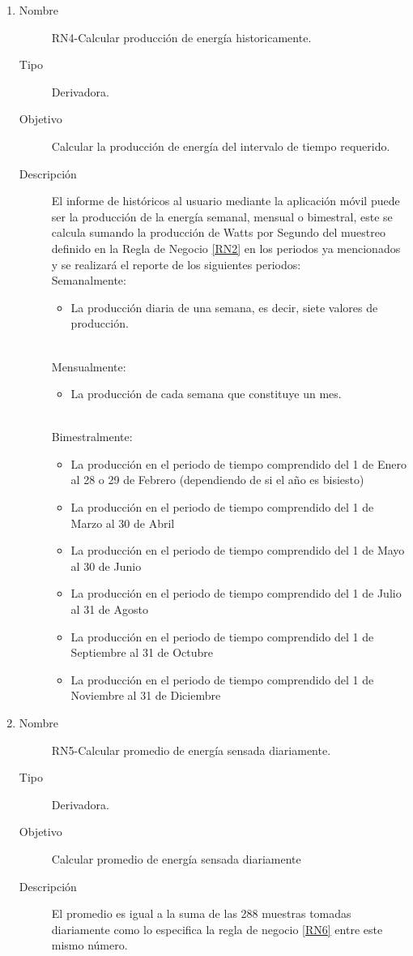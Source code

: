 \begin{enumerate}[label=RN\arabic*.]
\item \label{RN4}
		\begin{description}
			\item[Nombre] RN4-Calcular producción de energía historicamente.
			\item[Tipo] Derivadora.
			\item[Objetivo] Calcular la producción de energía del intervalo de tiempo requerido.
			\item[Descripción] El informe de históricos al usuario mediante la aplicación móvil puede ser la producción de la energía semanal, mensual o bimestral, este se calcula sumando la producción de Watts por Segundo del muestreo definido en la Regla de Negocio \ref{RN2} en los periodos ya mencionados y se realizará el reporte de los siguientes periodos:
			\\ Semanalmente: 
			\begin{itemize}
				\item La producción diaria de una semana, es decir, siete valores de producción.
			\end{itemize}
			\\ Mensualmente: 
			\begin{itemize}
				\item La producción de cada semana que constituye un mes.
			\end{itemize}
			\\ Bimestralmente: 
			\begin{itemize}
				\item La producción en el periodo de tiempo comprendido del 1 de Enero al 28 o 29 de Febrero (dependiendo de si el año es bisiesto)
				\item La producción en el periodo de tiempo comprendido del 1 de Marzo al 30 de Abril
				\item La producción en el periodo de tiempo comprendido del 1 de Mayo al 30 de Junio
				\item La producción en el periodo de tiempo comprendido del 1 de Julio al 31 de Agosto
				\item La producción en el periodo de tiempo comprendido del 1 de Septiembre al 31 de Octubre
				\item La producción en el periodo de tiempo comprendido del 1 de Noviembre al 31 de Diciembre
			\end{itemize}
		\end{description}

\item \label{RN5}
		\begin{description}
			\item[Nombre] RN5-Calcular promedio de energía sensada diariamente.
			\item[Tipo] Derivadora.
			\item[Objetivo] Calcular promedio de energía sensada diariamente
			\item[Descripción] El promedio es igual a la suma de las 288 muestras tomadas  diariamente como lo especifica la regla de negocio \ref{RN6} entre este mismo número.	\end{description}


\end{enumerate}

